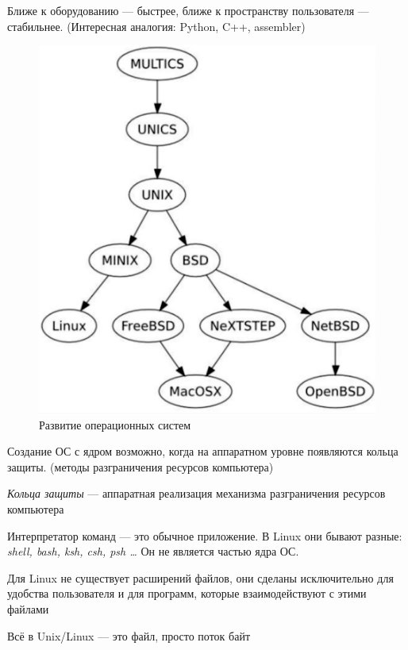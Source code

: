 \documentclass[oneside, final, 14pt]{extreport} %
\begin{document}
Ближе к оборудованию --- быстрее, ближе к пространству пользователя --- стабильнее.
(Интересная аналогия: Python, C++, assembler)

\begin{figure}[t]
    \centering
    \includegraphics[height=0.3\textheight]{2.png}
    \caption{Развитие операционных систем}
    \label{fig:2}

\end{figure}

Создание ОС с ядром возможно, когда на аппаратном уровне появляются
кольца защиты. (методы разграничения ресурсов компьютера)

\textit{Кольца защиты} --- аппаратная реализация механизма
разграничения ресурсов компьютера 


Интерпретатор команд --- это обычное приложение. В Linux
они бывают разные: \textit{shell, bash, ksh, csh, psh \ldots} Он не 
является частью ядра ОС.

Для Linux не существует расширений файлов, они сделаны 
исключительно для удобства пользователя и для программ, которые 
взаимодействуют с этими файлами

Всё в Unix/Linux --- это файл, просто поток байт
\end{document}

